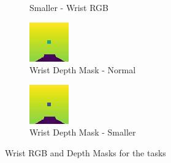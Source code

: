 \begin{figure}[htpb]
\begin{subfigure}{0.4\linewidth}
    \caption{Smaller - Wrist RGB}\label{subfig:small-rgb}
  \end{subfigure}
  \begin{subfigure}{0.40\linewidth}
    \centering
    \includegraphics[width=0.7\linewidth]{assets/depth-interfacing/normal-depth.png}
    \caption{Wrist Depth Mask - Normal}\label{subfig:normal-depth}
  \end{subfigure}
  \begin{subfigure}{0.40\linewidth}
    \centering
    \includegraphics[width=0.7\linewidth]{assets/depth-interfacing/smaller-depth.png}
    \caption{Wrist Depth Mask - Smaller}\label{subfig:small-depth}
  \end{subfigure}
  \caption{Wrist RGB and Depth Masks for the tasks}\label{fig:di-rgb-vs-depth}
\end{figure}

